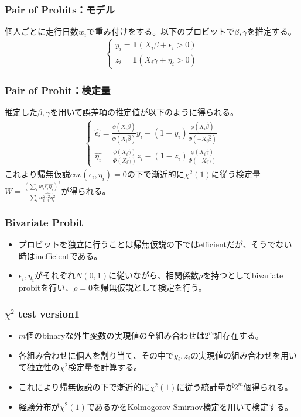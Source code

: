 \documentclass[dvipdfmx, 12pt]{beamer}
\begin{document}
\begin{frame}\frametitle{Pair of Probits：モデル}
個人ごとに走行日数$w_i$で重み付けをする。以下のプロビットで$\beta, \gamma$を推定する。
	\begin{align*}
	\begin{cases}
	y_i = {\bm 1}(X_i \beta + \epsilon_i > 0)\\[8pt]
	z_i = {\bm 1}(X_i \gamma + \eta_i > 0)
	\end{cases}
	\end{align*}
\end{frame}

\begin{frame}\frametitle{Pair of Probit：検定量}
推定した$\beta, \gamma$を用いて誤差項の推定値が以下のように得られる。
\begin{align*}
\begin{cases}
	\hat{\epsilon_i} = \frac{\phi(X_i \hat{\beta})}{\Phi(X_i \hat{\beta})} y_i - (1 - y_i) \frac{\phi(X_i \hat{\beta})}{\Phi(-X_i \hat{\beta})}\\[8pt]
	\hat{\eta_i} = \frac{\phi(X_i \hat{\gamma})}{\Phi(X_i \hat{\gamma})} z_i - (1 - z_i) \frac{\phi(X_i \hat{\gamma})}{\Phi(-X_i \hat{\gamma})}
\end{cases}
\end{align*}
これより帰無仮説$cov(\epsilon_i, \eta_i) = 0$の下で漸近的に$\chi^2(1)$に従う検定量$W = \frac{\left( \sum_{i} w_i \hat{\epsilon_i} \hat{\eta_i} \right)^2}{\sum_{i} w_i^2\hat{\epsilon_i^2}\hat{\eta_i^2}}$が得られる。
\end{frame}

\begin{frame}\frametitle{Bivariate Probit}
	\begin{itemize}
	\item プロビットを独立に行うことは帰無仮説の下ではefficientだが、そうでない時はinefficientである。
	\item $\epsilon_i, \eta_i$がそれぞれ$N(0,1)$に従いながら、相関係数$\rho$を持つとしてbivariate probitを行い、$\rho = 0$を帰無仮説として検定を行う。
	\end{itemize}
\end{frame}

\begin{frame}\frametitle{$\chi^2$ test version1}
	\begin{itemize}
	\item $m$個のbinaryな外生変数の実現値の全組み合わせは$2^m$組存在する。
	\item 各組み合わせに個人を割り当て、その中で$y_i, z_i$の実現値の組み合わせを用いて独立性の$\chi^2$検定量を計算する。
	\item これにより帰無仮説の下で漸近的に$\chi^2(1)$に従う統計量が$2^m$個得られる。
	\item 経験分布が$\chi^2(1)$であるかをKolmogorov-Smirnov検定を用いて検定する。
	\end{itemize}
\end{frame}
\end{document}
